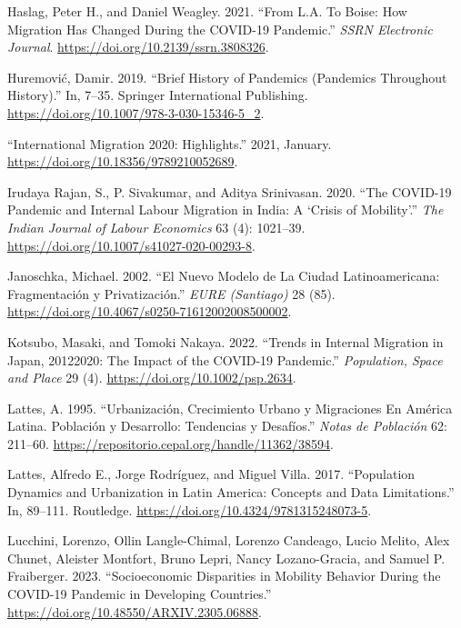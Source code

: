 \documentclass[11pt,letterpaper]{article}
\newlength{\cslhangindent}
\newlength{\cslentryspacingunit} %
\newenvironment{CSLReferences}[2] %
 {%
  \setlength{\parindent}{0pt}
  \ifodd #1
  \let\oldpar\par
  \def\par{\hangindent=\cslhangindent\oldpar}
  \fi
  \setlength{\parskip}{#2\cslentryspacingunit}
 }%
 {}
\begin{document}
\begin{CSLReferences}{1}{0}
\leavevmode{}%
Haslag, Peter H., and Daniel Weagley. 2021. {``From L.A. To Boise: How
Migration Has Changed During the COVID-19 Pandemic.''} \emph{SSRN
Electronic Journal}. \url{https://doi.org/10.2139/ssrn.3808326}.

\leavevmode{}%
Huremović, Damir. 2019. {``Brief History of Pandemics (Pandemics
Throughout History).''} In, 7--35. Springer International Publishing.
\url{https://doi.org/10.1007/978-3-030-15346-5_2}.

\leavevmode{}%
{``International Migration 2020: Highlights.''} 2021, January.
\url{https://doi.org/10.18356/9789210052689}.

\leavevmode{}%
Irudaya Rajan, S., P. Sivakumar, and Aditya Srinivasan. 2020. {``The
COVID-19 Pandemic and Internal Labour Migration in India: A {`}Crisis of
Mobility{'}.''} \emph{The Indian Journal of Labour Economics} 63 (4):
1021--39. \url{https://doi.org/10.1007/s41027-020-00293-8}.

\leavevmode{}%
Janoschka, Michael. 2002. {``El Nuevo Modelo de La Ciudad
Latinoamericana: Fragmentación y Privatización.''} \emph{EURE
(Santiago)} 28 (85).
\url{https://doi.org/10.4067/s0250-71612002008500002}.

\leavevmode{}%
Kotsubo, Masaki, and Tomoki Nakaya. 2022. {``Trends in Internal
Migration in Japan, 2012{\textendash}2020: The Impact of the COVID{-}19
Pandemic.''} \emph{Population, Space and Place} 29 (4).
\url{https://doi.org/10.1002/psp.2634}.

\leavevmode{}%
Lattes, A. 1995. {``Urbanización, Crecimiento Urbano y Migraciones En
América Latina. Población y Desarrollo: Tendencias y Desafíos.''}
\emph{Notas de Población} 62: 211--60.
\url{https://repositorio.cepal.org/handle/11362/38594}.

\leavevmode{}%
Lattes, Alfredo E., Jorge Rodríguez, and Miguel Villa. 2017.
{``Population Dynamics and Urbanization in Latin America: Concepts and
Data Limitations.''} In, 89--111. Routledge.
\url{https://doi.org/10.4324/9781315248073-5}.

\leavevmode{}%
Lucchini, Lorenzo, Ollin Langle-Chimal, Lorenzo Candeago, Lucio Melito,
Alex Chunet, Aleister Montfort, Bruno Lepri, Nancy Lozano-Gracia, and
Samuel P. Fraiberger. 2023. {``Socioeconomic Disparities in Mobility
Behavior During the COVID-19 Pandemic in Developing Countries.''}
\url{https://doi.org/10.48550/ARXIV.2305.06888}.


\end{CSLReferences}
\end{document}
